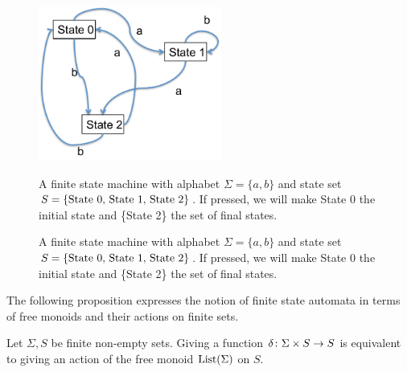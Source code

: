 \begin{figure}[h]
\begin{center}
\includegraphics[height=2in]{FSM1}
\end{center}
\begin{blockENG}
\caption{A finite state machine with alphabet $\Sigma=\{a,b\}$ and state set $S=\{\textnormal{State 0, State 1, State 2}\}$. If pressed, we will make State 0 the initial state and \{State 2\} the set of final states.}\label{fig:fsa}
\end{blockENG}
\begin{blockRUS}
\caption{A finite state machine with alphabet $\Sigma=\{a,b\}$ and state set $S=\{\textnormal{State 0, State 1, State 2}\}$. If pressed, we will make State 0 the initial state and \{State 2\} the set of final states.}\label{fig:fsa}
\end{blockRUS}
\end{figure}

\begin{blockENG}
The following proposition expresses the notion of finite state automata in terms of free monoids and their actions on finite sets.
\end{blockENG}

\begin{blockRUS}
\end{blockRUS}

\begin{propositionENG}
Let $\Sigma, S$ be finite non-empty sets. Giving a function $\delta\colon\Sigma\times S\rightarrow S$ is equivalent to giving an action of the free monoid $\textnormal{List}(\Sigma)$ on $S$. 
\end{propositionENG}

\begin{propositionRUS}
\end{propositionRUS}

